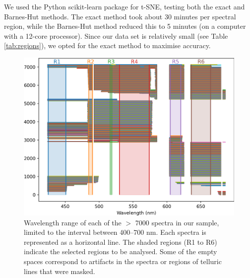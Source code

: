 \documentclass{aa}
\begin{document}
We used the Python scikit-learn package \citep{scikit-learn} for t-SNE, testing both the exact and Barnes-Hut methods. The exact method took about 30 minutes per spectral region, while the Barnes-Hut method reduced this to 5 minutes (on a computer with a 12-core processor). Since our data set is relatively small (see Table \ref{tab:regions}), we opted for the exact method to maximise accuracy.

\begin{figure}[t]
  \centering
  \includegraphics[width=\linewidth]{Plots/region_select.pdf}
  \caption{Wavelength range of each of the $>$ 7000 spectra in our sample, limited to the interval between 400--700 nm. Each spectra is represented as a horizontal line. The shaded regions (R1 to R6) indicate the selected regions to be analysed. Some of the empty spaces correspond to artifacts in the spectra or regions of telluric lines that were masked.}
  \label{fig:region_select}
\end{figure}
\end{document}
